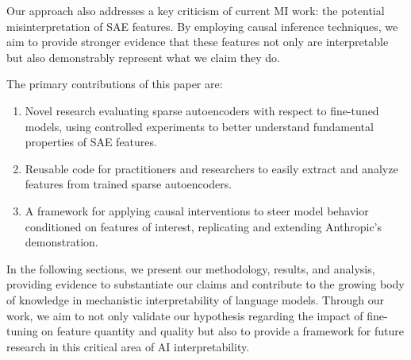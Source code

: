 Our approach also addresses a key criticism of current MI work: the potential misinterpretation of SAE features. By employing causal inference techniques, we aim to provide stronger evidence that these features not only are interpretable but also demonstrably represent what we claim they do.

The primary contributions of this paper are:

\begin{enumerate}
    \item Novel research evaluating sparse autoencoders with respect to fine-tuned models, using controlled experiments to better understand fundamental properties of SAE features.
    \item Reusable code for practitioners and researchers to easily extract and analyze features from trained sparse autoencoders.
    \item A framework for applying causal interventions to steer model behavior conditioned on features of interest, replicating and extending Anthropic's demonstration.
\end{enumerate}

In the following sections, we present our methodology, results, and analysis, providing evidence to substantiate our claims and contribute to the growing body of knowledge in mechanistic interpretability of language models. Through our work, we aim to not only validate our hypothesis regarding the impact of fine-tuning on feature quantity and quality but also to provide a framework for future research in this critical area of AI interpretability.